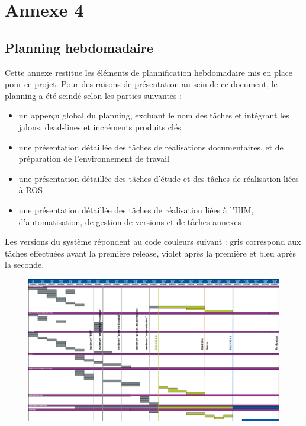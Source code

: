 \chapter*{Annexe 4}
\label{annexe:planning}

\makeatletter
\renewcommand{\thesection}{\@arabic\c@section}
\makeatother

\setcounter{section}{0}

\section{Planning hebdomadaire}

Cette annexe restitue les éléments de plannification hebdomadaire mis en place pour ce projet. 
Pour des raisons de présentation au sein de ce document, le planning a été scindé selon les parties suivantes : 

\begin{itemize}
 \item un apperçu global du planning, excluant le nom des tâches et intégrant les jalons, dead-lines et incréments produits clés 
 \item une présentation détaillée des tâches de réalisations documentaires, et de préparation de l'environnement de travail
 \item une présentation détaillée des tâches d'étude et des tâches de réalisation liées à ROS
 \item une présentation détaillée des tâches de réalisation liées à l'IHM, d'automatisation, de gestion de versions et de tâches annexes 
\end{itemize}

Les versions du système répondent au code couleurs suivant : gris correspond aux tâches effectuées avant la première release, violet après la première et bleu après la seconde. 

\begin{figure}
\centering
    \includegraphics[width=1.\linewidth]{figures/planning-overview}  
  \label{fig:planning-overview}
\end{figure}

